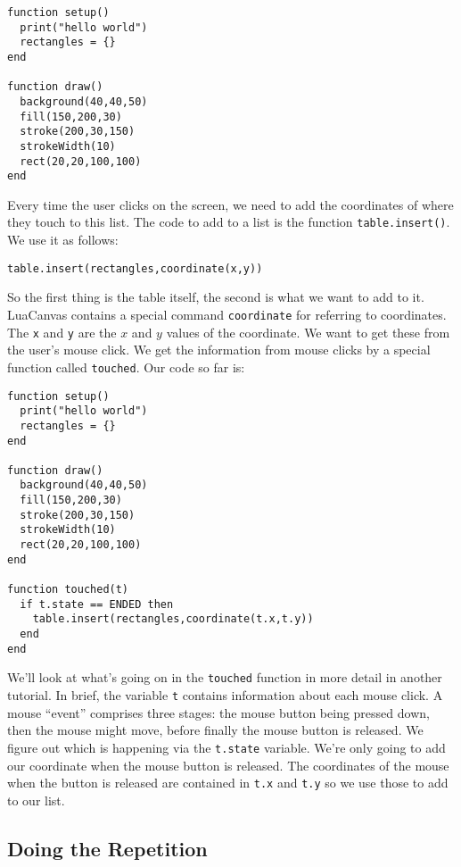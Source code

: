 \documentclass[
  xhtml,%
  use filename%
]{internet}
\begin{document}
\begin{verbatim}
function setup()
  print("hello world")
  rectangles = {}
end

function draw()
  background(40,40,50)
  fill(150,200,30)
  stroke(200,30,150)
  strokeWidth(10)
  rect(20,20,100,100)
end
\end{verbatim}

Every time the user clicks on the screen, we need to add the coordinates of where they touch to this list.
The code to add to a list is the function \verb+table.insert()+.
We use it as follows:

\begin{verbatim}
table.insert(rectangles,coordinate(x,y))
\end{verbatim}

\noindent So the first thing is the table itself, the second is what we want to add to it.
LuaCanvas contains a special command \verb+coordinate+ for referring to coordinates.
The \verb+x+ and \verb+y+ are the \(x\) and \(y\) values of the coordinate.
We want to get these from the user's mouse click.
We get the information from mouse clicks by a special function called \verb+touched+.
Our code so far is:

\begin{verbatim}
function setup()
  print("hello world")
  rectangles = {}
end

function draw()
  background(40,40,50)
  fill(150,200,30)
  stroke(200,30,150)
  strokeWidth(10)
  rect(20,20,100,100)
end

function touched(t)
  if t.state == ENDED then
    table.insert(rectangles,coordinate(t.x,t.y))
  end
end
\end{verbatim}

We'll look at what's going on in the \verb+touched+ function in more detail in another tutorial.
In brief, the variable \verb+t+ contains information about each mouse click.
A mouse ``event'' comprises three stages: the mouse button being pressed down, then the mouse might move, before finally the mouse button is released.
We figure out which is happening via the \verb+t.state+ variable.
We're only going to add our coordinate when the mouse button is released.
The coordinates of the mouse when the button is released are contained in \verb+t.x+ and \verb+t.y+ so we use those to add to our list.

\subsection{Doing the Repetition}
\end{document}
